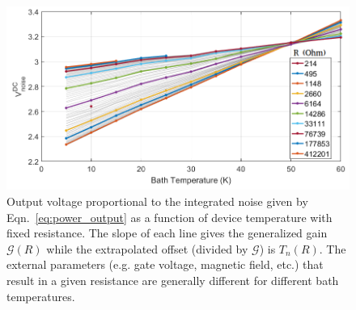 \begin{figure}
\centering
\includegraphics[width = 130mm]{figures/Johnson_noise_thermometry/Vn_vs_T}
\caption{Output voltage proportional to the integrated noise given by Eqn.~\ref{eq:power_output} as a function of device temperature with fixed resistance. The slope of each line gives the generalized gain $\mathcal{G}(R)$ while the extrapolated offset (divided by $\mathcal{G}$) is $T_n(R)$. The external parameters (e.g. gate voltage, magnetic field, etc.) that result in a given resistance are generally different for different bath temperatures.}
\label{fig:JNT_Vn_vs_T}
\end{figure}

